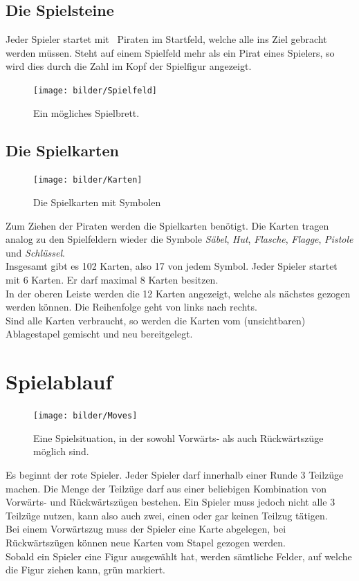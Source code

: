 \documentclass[a4paper, ngerman]{scrartcl}
\begin{document}
\subsection{Die Spielsteine}
Jeder Spieler startet mit \PiratenAnzahl\ Piraten im Startfeld, welche alle ins
Ziel gebracht werden müssen. Steht auf einem Spielfeld mehr als ein Pirat eines
Spielers, so wird dies durch die Zahl im Kopf der Spielfigur angezeigt.
\begin{figure}[h] \centering \texttt{[image: bilder/Spielfeld]}
	\caption{Ein mögliches Spielbrett.}
	\label{fig:Spielfeld}
	\end{figure}
	
	\subsection{Die Spielkarten}
	
	\begin{figure}[h]
		\centering
		\texttt{[image: bilder/Karten]}
		\caption{Die Spielkarten mit Symbolen}
		\label{fig:spielkarten}
	\end{figure}
	Zum Ziehen der Piraten werden die Spielkarten benötigt. Die Karten
	tragen analog zu den Spielfeldern wieder die Symbole \emph{Säbel},  \emph{Hut},
	\emph{Flasche}, \emph{Flagge}, \emph{Pistole} und
	\emph{Schlüssel}.\\
	Insgesamt gibt es 102 Karten, also 17 von jedem Symbol. Jeder Spieler startet
	mit 6 Karten. Er darf maximal 8 Karten besitzen.\\
	In der oberen Leiste werden die 12 Karten angezeigt, welche als
	nächstes gezogen werden können. Die Reihenfolge geht von links nach rechts.\\
	Sind alle Karten verbraucht, so werden die Karten vom (unsichtbaren)
	Ablagestapel gemischt und neu bereitgelegt.
\section{Spielablauf}	
	\begin{figure}[h]
		\centering
		\texttt{[image: bilder/Moves]}
		\caption{Eine Spielsituation, in der sowohl Vorwärts- als auch Rückwärtszüge
		möglich sind.}
		\label{fig:PossibleMoves}
	\end{figure}	
	Es beginnt der rote Spieler. Jeder Spieler darf innerhalb einer Runde 3
	Teilzüge machen. Die Menge der Teilzüge darf aus einer beliebigen Kombination
	von Vorwärts- und Rückwärtszügen bestehen. Ein Spieler muss jedoch nicht alle 3
	Teilzüge nutzen, kann also auch zwei, einen oder gar keinen Teilzug tätigen.\\
	Bei einem Vorwärtszug muss der Spieler eine Karte  abgelegen, bei
	Rückwärtszügen können neue Karten vom Stapel gezogen werden.\\
	Sobald ein Spieler eine Figur ausgewählt hat, werden sämtliche Felder, auf
	welche die Figur ziehen kann, grün markiert.
	
\end{document}
